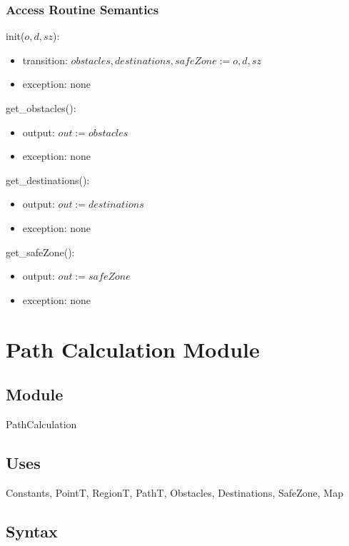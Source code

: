 \documentclass[12pt]{article}
\begin{document}
\subsubsection* {Access Routine Semantics}
\noindent init($o, d, sz$):
\begin{itemize}
\item transition: $\mathit{obstacles}, \mathit{destinations}, \mathit{safeZone}  := o, d, sz$
\item exception: none
\end{itemize}
\noindent get\_obstacles():
\begin{itemize}
\item output: $\mathit{out} := \mathit{obstacles}$
\item exception: none
\end{itemize}
\noindent get\_destinations():
\begin{itemize}
\item output: $\mathit{out} := \mathit{destinations}$
\item exception: none
\end{itemize}
\noindent get\_safeZone():
\begin{itemize}
\item output: $\mathit{out} := \mathit{safeZone}$
\item exception: none
\end{itemize}
\newpage



\section* {Path Calculation Module}
\subsection* {Module}
PathCalculation
\subsection* {Uses}
Constants, PointT, RegionT, PathT, Obstacles, Destinations, SafeZone, Map
\subsection* {Syntax}
\end{document}
